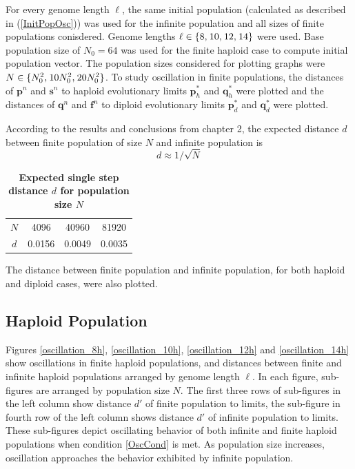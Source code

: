 For every genome length $\ell$, the same initial population (calculated as described in (\ref{InitPopOsc})) was used for the infinite population and all 
sizes of finite populations conisdered.
Genome lengths $\ell \in \{8, \hspace{0.01in}10, \hspace{0.01in}12, \hspace{0.01in}14\}$ were used. Base population size of $N_0 = 64$ was used 
for the finite haploid case to compute initial population vector. The population sizes considered for plotting 
graphs were $N \in \{N_0^2, \hspace{0.01in}10N_0^2, \hspace{0.01in}20N_0^2\}$. 
To study oscillation in finite populations, the distances of $\bm{p}^n$ and $\bm{s}^n$ to haploid evolutionary limits $\bm{p}_h^{\ast}$ and 
$\bm{q}_h^{\ast}$ were plotted and the distances of $\bm{q}^n$ and 
$\bm{f}^n$ to diploid evolutionary limits $\bm{p}_d^{\ast}$ and $\bm{q}_d^{\ast}$ were plotted. 

According to the results and conclusions from 
chapter 2, the expected distance $d$ between finite population of size $N$ and infinite population is 
\[ d \approx 1/\sqrt{N} \]
\begin{table}[H]
\caption{\textbf{Expected single step distance $d$ for population size $N$}}
\centering
\begin{tabular}{c c c c}
\hline
$N$ & 4096 & 40960 & 81920 \\
$d$ & 0.0156 & 0.0049 & 0.0035 \\
\hline
\end{tabular}
\label{tableExpectedDistance}
\end{table}
The distance between finite population and infinite population, for both haploid and diploid cases, were also plotted. 

\clearpage
\subsection{Haploid Population}

\clearpage

Figures \ref{oscillation_8h}, \ref{oscillation_10h}, \ref{oscillation_12h} and
\ref{oscillation_14h} show oscillations in finite haploid populations, and distances 
between finite and infinite haploid populations arranged by genome length $\ell$. 
In each figure, sub-figures are arranged by population size $N$. 
The first three rows of sub-figures in the left column show distance $d'$ of finite population 
to limits, the sub-figure in fourth row of the left column shows distance $d'$ of infinite population to limits. 
These sub-figures depict 
oscillating behavior of both infinite and finite haploid populations when condition \ref{OscCond} is met. 
As population size increases, oscillation approaches the behavior exhibited by infinite population. 

